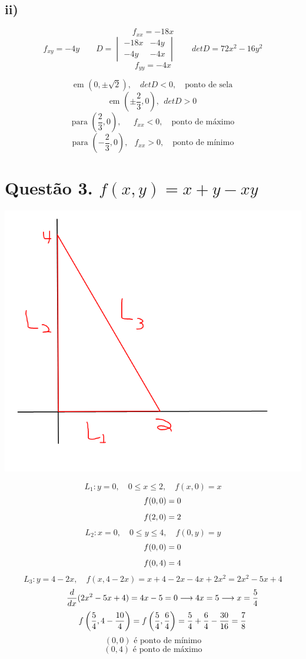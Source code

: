 \documentclass[12pt]{article}
\begin{document}
\subsection{ii)}

\[f_{xx} = -18x\]
\[f_{xy} = -4y \qquad D = \begin{vmatrix}
                          	-18x & -4y \\
                          	-4y & -4x
                          \end{vmatrix} \qquad detD = 72x^{2}-16y^{2}\]
\[f_{yy} = -4x\]

\[\text{em }(0,\pm \sqrt{2}), \quad detD < 0, \quad \text{ponto de sela}\]
\[\text{em }\left( \pm \dfrac{2}{3}, 0 \right), \ \  detD > 0\]
\[\text{para }\left( \dfrac{2}{3}, 0 \right), \quad\ \ f_{xx} < 0, \quad \text{ponto de máximo}\]
\[\text{para }\left( -\dfrac{2}{3}, 0 \right), \ \ \; f_{xx} > 0, \quad \text{ponto de mínimo}\]

\section{Questão 3. $f(x,y)=x+y-xy$}

\includegraphics[scale = 0.4]{q2}

\[L_{1}: y=0, \quad 0 \leq x \leq 2, \quad f(x,0) = x\]
\[\hspace{+24pt} f(0,0) = 0\]
\[\hspace{+24pt} f(2,0) = 2\]
\[L_{2}: x=0, \quad 0 \leq y \leq 4, \quad f(0,y) = y\]
\[\hspace{+24pt} f(0,0) = 0\]
\[\hspace{+24pt} f(0,4) = 4\]
\[L_{3}: y = 4-2x, \quad f(x,4-2x) = x+4-2x-4x+2x^{2} = 2x^{2}-5x+4\]
\[\hspace{+24pt} \dfrac{d}{dx}(2x^{2}-5x+4) = 4x-5 = 0 \longrightarrow 4x = 5 \longrightarrow x = \dfrac{5}{4}\]
\[\hspace{+24pt} f \left( \dfrac{5}{4}, 4-\dfrac{10}{4} \right) = f \left( \dfrac{5}{4}, \dfrac{6}{4} \right) = \dfrac{5}{4} + \dfrac{6}{4} - \dfrac{30}{16} = \dfrac{7}{8}\]
\[(0,0) \text{ é ponto de mínimo}\]
\[(0,4) \text{ é ponto de máximo}\]
\end{document}
